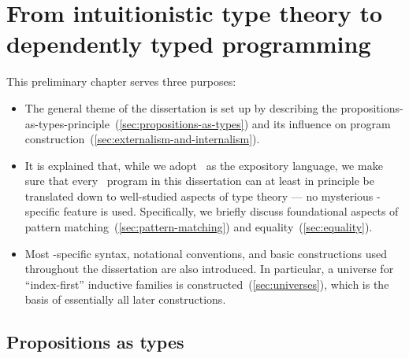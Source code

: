 \chapter{From intuitionistic type theory to dependently typed programming}
\label{chap:background}

This preliminary chapter serves three purposes:
\begin{itemize}
\item The general theme of the dissertation is set up by describing the propositions-as-types-principle~(\autoref{sec:propositions-as-types}) and its influence on program construction~(\autoref{sec:externalism-and-internalism}).
\item It is explained that, while we adopt \Agda\ as the expository language, we make sure that every \Agda\ program in this dissertation can at least in principle be translated down to well-studied aspects of type theory --- no mysterious \Agda-specific feature is used.
Specifically, we briefly discuss foundational aspects of pattern matching~(\autoref{sec:pattern-matching}) and equality~(\autoref{sec:equality}).
\item Most \Agda-specific syntax, notational conventions, and basic constructions used throughout the dissertation are also introduced.
In particular, a universe for ``index-first'' inductive families is constructed~(\autoref{sec:universes}), which is the basis of essentially all later constructions.
\end{itemize}


\section{Propositions as types}
\label{sec:propositions-as-types}

